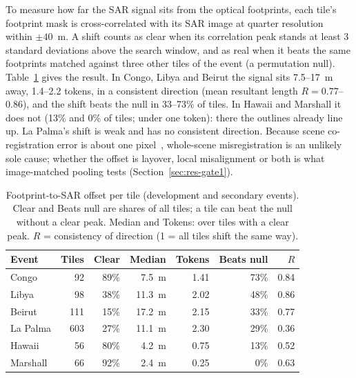 \documentclass{ieeeaccess}
\begin{document}
To measure how far the SAR signal sits from the optical footprints, each tile's footprint mask is cross-correlated with its SAR image at quarter resolution within $\pm40$~m. A shift counts as clear when its correlation peak stands at least 3 standard deviations above the search window, and as real when it beats the same footprints matched against three other tiles of the event (a permutation null). Table~\ref{tab:offsets} gives the result. In Congo, Libya and Beirut the signal sits 7.5--17~m away, 1.4--2.2 tokens, in a consistent direction (mean resultant length $R=0.77$--$0.86$), and the shift beats the null in 33--73\% of tiles. In Hawaii and Marshall it does not (13\% and 0\% of tiles; under one token): there the outlines already line up. La Palma's shift is weak and has no consistent direction. Because scene co-registration error is about one pixel~\cite{chen2025bright}, whole-scene misregistration is an unlikely sole cause; whether the offset is layover, local misalignment or both is what image-matched pooling tests (Section~\ref{sec:res-gate1}).

\begin{table}[t]
\centering
\caption{Footprint-to-SAR offset per tile (development and secondary events). Clear and Beats null are shares of all tiles; a tile can beat the null without a clear peak. Median and Tokens: over tiles with a clear peak. $R$ = consistency of direction (1 = all tiles shift the same way).}
\label{tab:offsets}
\footnotesize
\begin{tabular}{@{}lrrrrrr@{}}
\toprule
Event & Tiles & Clear & Median & Tokens & Beats null & $R$ \\
\midrule
Congo & 92 & 89\% & 7.5~m & 1.41 & 73\% & 0.84 \\
Libya & 98 & 38\% & 11.3~m & 2.02 & 48\% & 0.86 \\
Beirut & 111 & 15\% & 17.2~m & 2.15 & 33\% & 0.77 \\
La Palma & 603 & 27\% & 11.1~m & 2.30 & 29\% & 0.36 \\
Hawaii & 56 & 80\% & 4.2~m & 0.75 & 13\% & 0.52 \\
Marshall & 66 & 92\% & 2.4~m & 0.25 & 0\% & 0.63 \\
\bottomrule
\end{tabular}
\end{table}
\end{document}
